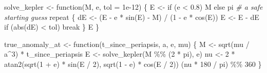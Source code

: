\documentclass[
  10.5pt,
  letterpaper,
]{scrbook}
\newenvironment{Shaded}{\begin{snugshade}}{\end{snugshade}}
\newcommand{\AttributeTok}[1]{\textcolor[rgb]{0.00,0.00,0.00}{#1}}
\newcommand{\CommentTok}[1]{\textcolor[rgb]{0.00,0.00,0.00}{\textit{#1}}}
\newcommand{\ControlFlowTok}[1]{\textcolor[rgb]{0.00,0.00,0.00}{#1}}
\newcommand{\DecValTok}[1]{\textcolor[rgb]{0.00,0.00,0.00}{#1}}
\newcommand{\FloatTok}[1]{\textcolor[rgb]{0.00,0.00,0.00}{#1}}
\newcommand{\FunctionTok}[1]{\textcolor[rgb]{0.00,0.00,0.00}{#1}}
\newcommand{\NormalTok}[1]{\textcolor[rgb]{0.00,0.00,0.00}{#1}}
\newcommand{\OtherTok}[1]{\textcolor[rgb]{0.00,0.00,0.00}{#1}}
\newcommand{\SpecialCharTok}[1]{\textcolor[rgb]{0.00,0.00,0.00}{#1}}
\theoremstyle{plain}
\theoremstyle{remark}
\begin{document}
\begin{Shaded}
\begin{Highlighting}[]
\NormalTok{solve\_kepler }\OtherTok{\textless{}{-}} \ControlFlowTok{function}\NormalTok{(M, e, }\AttributeTok{tol =} \FloatTok{1e{-}12}\NormalTok{) \{}
\NormalTok{  E }\OtherTok{\textless{}{-}} \ControlFlowTok{if}\NormalTok{ (e }\SpecialCharTok{\textless{}} \FloatTok{0.8}\NormalTok{) M }\ControlFlowTok{else}\NormalTok{ pi          }\CommentTok{\# a safe starting guess}
  \ControlFlowTok{repeat}\NormalTok{ \{}
\NormalTok{    dE }\OtherTok{\textless{}{-}}\NormalTok{ (E }\SpecialCharTok{{-}}\NormalTok{ e }\SpecialCharTok{*} \FunctionTok{sin}\NormalTok{(E) }\SpecialCharTok{{-}}\NormalTok{ M) }\SpecialCharTok{/}\NormalTok{ (}\DecValTok{1} \SpecialCharTok{{-}}\NormalTok{ e }\SpecialCharTok{*} \FunctionTok{cos}\NormalTok{(E))}
\NormalTok{    E  }\OtherTok{\textless{}{-}}\NormalTok{ E }\SpecialCharTok{{-}}\NormalTok{ dE}
    \ControlFlowTok{if}\NormalTok{ (}\FunctionTok{abs}\NormalTok{(dE) }\SpecialCharTok{\textless{}}\NormalTok{ tol) }\ControlFlowTok{break}
\NormalTok{  \}}
\NormalTok{  E}
\NormalTok{\}}

\NormalTok{true\_anomaly\_at }\OtherTok{\textless{}{-}} \ControlFlowTok{function}\NormalTok{(t\_since\_periapsis, a, e, mu) \{}
\NormalTok{  M  }\OtherTok{\textless{}{-}} \FunctionTok{sqrt}\NormalTok{(mu }\SpecialCharTok{/}\NormalTok{ a}\SpecialCharTok{\^{}}\DecValTok{3}\NormalTok{) }\SpecialCharTok{*}\NormalTok{ t\_since\_periapsis}
\NormalTok{  E  }\OtherTok{\textless{}{-}} \FunctionTok{solve\_kepler}\NormalTok{(M }\SpecialCharTok{\%\%}\NormalTok{ (}\DecValTok{2} \SpecialCharTok{*}\NormalTok{ pi), e)}
\NormalTok{  nu }\OtherTok{\textless{}{-}} \DecValTok{2} \SpecialCharTok{*} \FunctionTok{atan2}\NormalTok{(}\FunctionTok{sqrt}\NormalTok{(}\DecValTok{1} \SpecialCharTok{+}\NormalTok{ e) }\SpecialCharTok{*} \FunctionTok{sin}\NormalTok{(E }\SpecialCharTok{/} \DecValTok{2}\NormalTok{), }\FunctionTok{sqrt}\NormalTok{(}\DecValTok{1} \SpecialCharTok{{-}}\NormalTok{ e) }\SpecialCharTok{*} \FunctionTok{cos}\NormalTok{(E }\SpecialCharTok{/} \DecValTok{2}\NormalTok{))}
\NormalTok{  (nu }\SpecialCharTok{*} \DecValTok{180} \SpecialCharTok{/}\NormalTok{ pi) }\SpecialCharTok{\%\%} \DecValTok{360}
\NormalTok{\}}
\end{Highlighting}
\end{Shaded}
\end{document}
